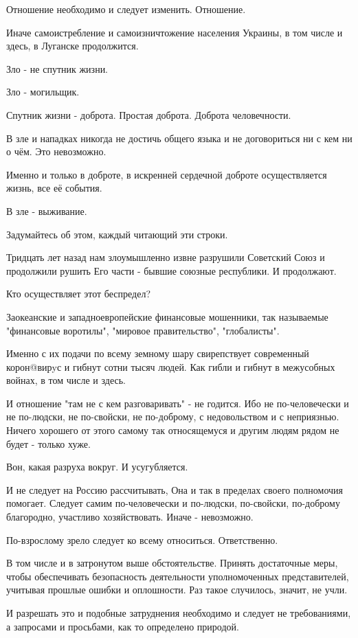 \begin{itemize}
Отношение необходимо и следует изменить. Отношение.

Иначе самоистребление и самоизничтожение населения Украины, в том числе и
здесь, в Луганске продолжится.

Зло - не спутник жизни.

Зло - могильщик.

Спутник жизни - доброта. Простая доброта. Доброта человечности.

В зле и нападках никогда не достичь общего языка и не договориться ни с кем ни
о чём. Это невозможно.

Именно и только в доброте, в искренней сердечной доброте осуществляется жизнь,
все её события.

В зле - выживание.

Задумайтесь об этом, каждый читающий эти строки.

Тридцать лет назад нам злоумышленно извне разрушили Советский Союз и продолжили
рушить Его части - бывшие союзные республики. И продолжают.

Кто осуществляет этот беспредел?

Заокеанские и западноевропейские финансовые мошенники, так называемые
"финансовые воротилы", "мировое правительство", "глобалисты".

Именно с их подачи по всему земному шару свирепствует современный корон@вирyс и
гибнут сотни тысяч людей. Как гибли и гибнут в межусобных войнах, в том числе и
здесь.

И отношение "там не с кем разговаривать" - не годится. Ибо не по-человечески и
не по-людски, не по-свойски, не по-доброму, с недовольством и с неприязнью.
Ничего хорошего от этого самому так относящемуся и другим людям рядом не будет
- только хуже.

Вон, какая разруха вокруг. И усугубляется.

И не следует на Россию рассчитывать, Она и так в пределах своего полномочия
помогает. Следует самим по-человечески и по-людски, по-свойски, по-доброму
благородно, участливо хозяйствовать. Иначе - невозможно.

По-взрослому зрело следует ко всему относиться. Ответственно.

В том числе и в затронутом выше обстоятельстве. Принять достаточные меры, чтобы
обеспечивать безопасность деятельности уполномоченных представителей, учитывая
прошлые ошибки и оплошности. Раз такое случилось, значит, не учли.

И разрешать это и подобные затруднения необходимо и следует не требованиями, а
запросами и просьбами, как то определено природой.


\end{itemize}
